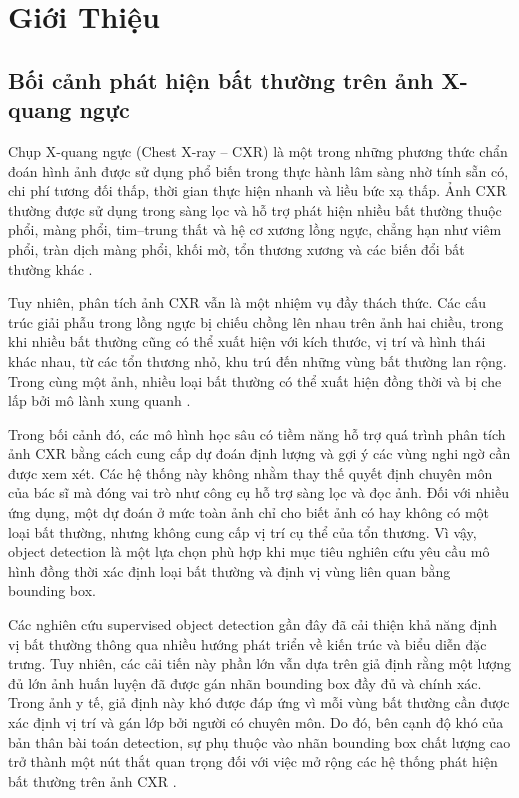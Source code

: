 \documentclass[pdflatex,sn-mathphys-num]{sn-jnl}%
\theoremstyle{thmstyleone}%
\theoremstyle{thmstyletwo}%
\theoremstyle{thmstylethree}%
\begin{document}
\maketitle

\section{Giới Thiệu}\label{sec:intro}
\subsection{Bối cảnh phát hiện bất thường trên ảnh X-quang ngực}


Chụp X-quang ngực (Chest X-ray -- CXR) là một trong những phương thức chẩn đoán hình ảnh được sử dụng phổ biến trong thực hành lâm sàng nhờ tính sẵn có, chi phí tương đối thấp, thời gian thực hiện nhanh và liều bức xạ thấp. Ảnh CXR thường được sử dụng trong sàng lọc và hỗ trợ phát hiện nhiều bất thường thuộc phổi, màng phổi, tim--trung thất và hệ cơ xương lồng ngực, chẳng hạn như viêm phổi, tràn dịch màng phổi, khối mờ, tổn thương xương và các biến đổi bất thường khác \cite{wang2017chestx,irvin2019chexpert,nguyen2022vindr}.

Tuy nhiên, phân tích ảnh CXR vẫn là một nhiệm vụ đầy thách thức. Các cấu trúc giải phẫu trong lồng ngực bị chiếu chồng lên nhau trên ảnh hai chiều, trong khi nhiều bất thường cũng có thể xuất hiện với kích thước, vị trí và hình thái khác nhau, từ các tổn thương nhỏ, khu trú đến những vùng bất thường lan rộng. Trong cùng một ảnh, nhiều loại bất thường có thể xuất hiện đồng thời và bị che lấp bởi mô lành xung quanh \cite{nguyen2022vindr,liu2020chestx}.

Trong bối cảnh đó, các mô hình học sâu có tiềm năng hỗ trợ quá trình phân tích ảnh CXR bằng cách cung cấp dự đoán định lượng và gợi ý các vùng nghi ngờ cần được xem xét. Các hệ thống này không nhằm thay thế quyết định chuyên môn của bác sĩ mà đóng vai trò như công cụ hỗ trợ sàng lọc và đọc ảnh. Đối với nhiều ứng dụng, một dự đoán ở mức toàn ảnh chỉ cho biết ảnh có hay không có một loại bất thường, nhưng không cung cấp vị trí cụ thể của tổn thương. Vì vậy, object detection là một lựa chọn phù hợp khi mục tiêu nghiên cứu yêu cầu mô hình đồng thời xác định loại bất thường và định vị vùng liên quan bằng bounding box.

Các nghiên cứu supervised object detection gần đây đã cải thiện khả năng định vị bất thường thông qua nhiều hướng phát triển về kiến trúc và biểu diễn đặc trưng. Tuy nhiên, các cải tiến này phần lớn vẫn dựa trên giả định rằng một lượng đủ lớn ảnh huấn luyện đã được gán nhãn bounding box đầy đủ và chính xác. Trong ảnh y tế, giả định này khó được đáp ứng vì mỗi vùng bất thường cần được xác định vị trí và gán lớp bởi người có chuyên môn. Do đó, bên cạnh độ khó của bản thân bài toán detection, sự phụ thuộc vào nhãn bounding box chất lượng cao trở thành một nút thắt quan trọng đối với việc mở rộng các hệ thống phát hiện bất thường trên ảnh CXR \cite{liu2020chestx,nguyen2022vindr,ji2022benchmark}.
\end{document}
